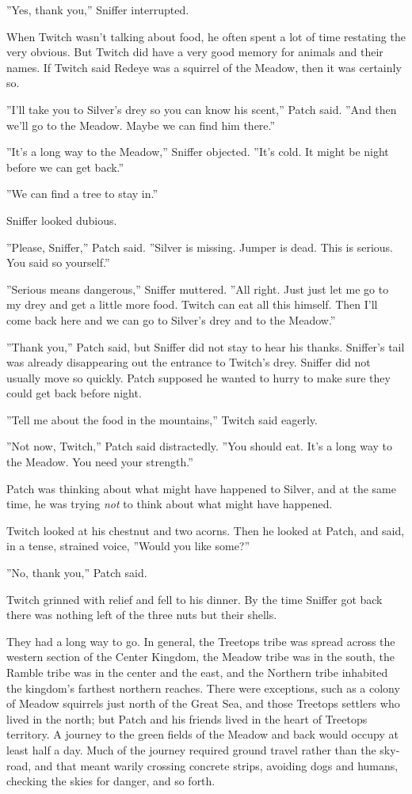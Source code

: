 \documentclass[12pt]{book}
\begin{document}
''Yes, thank you,'' Sniffer interrupted.

When Twitch wasn't talking about food, he often spent a lot of time restating the very obvious. But Twitch did have a very good memory for animals and their names. If Twitch said Redeye was a squirrel of the Meadow, then it was certainly so.

''I'll take you to Silver's drey so you can know his scent,'' Patch said. ''And then we'll go to the Meadow. Maybe we can find him there.''

''It's a long way to the Meadow,'' Sniffer objected. ''It's cold. It might be night before we can get back.''

''We can find a tree to stay in.''

Sniffer looked dubious.

''Please, Sniffer,'' Patch said. ''Silver is missing. Jumper is dead. This is serious. You said so yourself.''

''Serious means dangerous,'' Sniffer muttered. ''All right. Just %
just let me go to my drey and get a little more food. Twitch can eat all this himself. Then I'll come back here and we can go to Silver's drey and to the Meadow.''

''Thank you,'' Patch said, but Sniffer did not stay to hear his thanks. Sniffer's tail was already disappearing out the entrance to Twitch's drey. Sniffer did not usually move so quickly. Patch supposed he wanted to hurry to make sure they could get back before night.

''Tell me about the food in the mountains,'' Twitch said eagerly.

''Not now, Twitch,'' Patch said distractedly. ''You should eat. It's a long way to the Meadow. You need your strength.''

Patch was thinking about what might have happened to Silver, and at the same time, he was trying {\it not} to think about what might have happened.

Twitch looked at his chestnut and two acorns. Then he looked at Patch, and said, in a tense, strained voice, ''Would you like some?''

''No, thank you,'' Patch said.

Twitch grinned with relief and fell to his dinner. By the time Sniffer got back there was nothing left of the three nuts but their shells.

They had a long way to go. In general, the Treetops tribe was spread across the western section of the Center Kingdom, the Meadow tribe was in the south, the Ramble tribe was in the center and the east, and the Northern tribe inhabited the kingdom's farthest northern reaches. There were exceptions, such as a colony of Meadow squirrels just north of the Great Sea, and those Treetops settlers who lived in the north; but Patch and his friends lived in the heart of Treetops territory. A journey to the green fields of the Meadow and back would occupy at least half a day. Much of the journey required ground travel rather than the sky-road, and that meant warily crossing concrete strips, avoiding dogs and humans, checking the skies for danger, and so forth.
\end{document}
